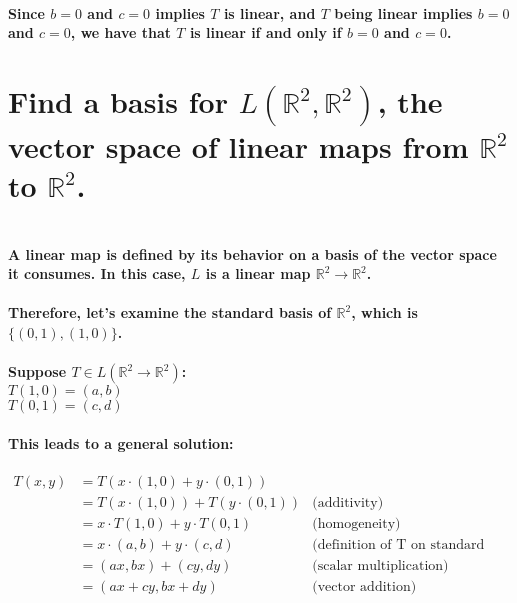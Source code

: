\documentclass{article}
\begin{document}
\paragraph{\large
Since $b = 0$ and $c = 0$ implies $T$ is linear, and $T$ being linear implies $b=0$ and $c=0$, we have that $T$ is linear if and only if $b = 0$ and $c = 0$.}

\newpage

\section{Find a basis for $L(\mathbb{R}^2,\mathbb{R}^2)$, the vector space of linear maps from $\mathbb{R}^2$ to $\mathbb{R}^2$.}

\paragraph{\large
\\A linear map is defined by its behavior on a basis of the vector space it consumes. In this case, $L$ is a linear map $\mathbb{R}^2 \rightarrow \mathbb{R}^2$.}

\paragraph{\large
Therefore, let's examine the standard basis of $\mathbb{R}^2$, which is $\{(0, 1), (1, 0)\}$.}

\paragraph{\large
Suppose $T \in L(\mathbb{R}^2 \rightarrow \mathbb{R}^2)$:
\\ $T(1, 0) = (a, b)$
\\ $T(0, 1) = (c, d)$}

\paragraph{\large
This leads to a general solution:}

\begin{align*}
T(x, y) &= T(x \cdot (1, 0) + y \cdot (0, 1))
\\&= T(x \cdot (1, 0)) + T(y \cdot (0, 1)) & \text{(additivity)}
\\&= x \cdot T(1, 0) + y \cdot T(0, 1) & \text{(homogeneity)}
\\&= x \cdot (a, b) + y \cdot (c, d) & \text{(definition of T on standard basis)}
\\&= (ax, bx) + (cy, dy) & \text{(scalar multiplication)}
\\&= (ax + cy, bx + dy) & \text{(vector addition)}
\end{align*}
\end{document}
